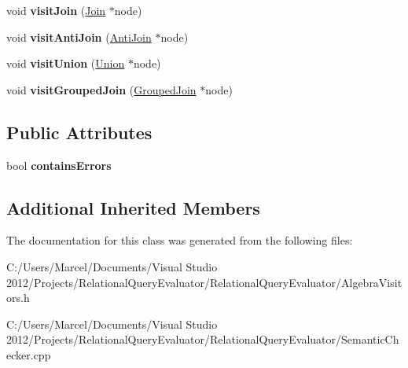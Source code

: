 \begin{DoxyCompactItemize}
\item 
\hypertarget{class_semantic_checker_a047de398ed6fab98a4ec6c1db533a66e}{void {\bfseries visit\+Join} (\hyperlink{class_join}{Join} $\ast$node)}\label{class_semantic_checker_a047de398ed6fab98a4ec6c1db533a66e}

\item 
\hypertarget{class_semantic_checker_aed141e3f22e681c74355fb3b84deb2d4}{void {\bfseries visit\+Anti\+Join} (\hyperlink{class_anti_join}{Anti\+Join} $\ast$node)}\label{class_semantic_checker_aed141e3f22e681c74355fb3b84deb2d4}

\item 
\hypertarget{class_semantic_checker_a120a86891155bd0296b9f3e878462bc6}{void {\bfseries visit\+Union} (\hyperlink{class_union}{Union} $\ast$node)}\label{class_semantic_checker_a120a86891155bd0296b9f3e878462bc6}

\item 
\hypertarget{class_semantic_checker_a44c4c5cf8cde9785a2a11f446d8fb90a}{void {\bfseries visit\+Grouped\+Join} (\hyperlink{class_grouped_join}{Grouped\+Join} $\ast$node)}\label{class_semantic_checker_a44c4c5cf8cde9785a2a11f446d8fb90a}

\end{DoxyCompactItemize}
\subsection*{Public Attributes}
\begin{DoxyCompactItemize}
\item 
\hypertarget{class_semantic_checker_a3683f9e8bd069bf8b76c42ea6ff11b96}{bool {\bfseries contains\+Errors}}\label{class_semantic_checker_a3683f9e8bd069bf8b76c42ea6ff11b96}

\end{DoxyCompactItemize}
\subsection*{Additional Inherited Members}


The documentation for this class was generated from the following files\+:\begin{DoxyCompactItemize}
\item 
C\+:/\+Users/\+Marcel/\+Documents/\+Visual Studio 2012/\+Projects/\+Relational\+Query\+Evaluator/\+Relational\+Query\+Evaluator/Algebra\+Visitors.\+h\item 
C\+:/\+Users/\+Marcel/\+Documents/\+Visual Studio 2012/\+Projects/\+Relational\+Query\+Evaluator/\+Relational\+Query\+Evaluator/Semantic\+Checker.\+cpp\end{DoxyCompactItemize}
